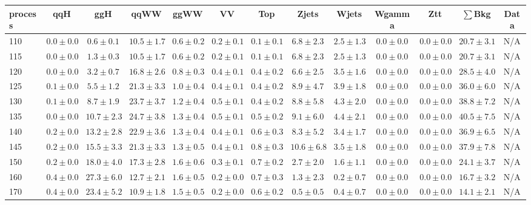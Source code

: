 \begin{table}
{%
 \tiny
 \begin{center}
 \begin{tabular}{l | c c | c c c c c c c c  | c c}
 \hline
 process & qqH & ggH & qqWW & ggWW & VV & Top & Zjets & Wjets & Wgamma & Ztt & $\sum$Bkg & Data \\
 \hline
110 & $0.0\pm0.0$ & $0.6\pm0.1$ & $10.5\pm1.7$ & $0.6\pm0.2$ & $0.2\pm0.1$ & $0.1\pm0.1$ & $6.8\pm2.3$ & $2.5\pm1.3$ & $0.0\pm0.0$ & $0.0\pm0.0$ & $20.7\pm3.1$ & N/A \\
115 & $0.0\pm0.0$ & $1.3\pm0.3$ & $10.5\pm1.7$ & $0.6\pm0.2$ & $0.2\pm0.1$ & $0.1\pm0.1$ & $6.8\pm2.3$ & $2.5\pm1.3$ & $0.0\pm0.0$ & $0.0\pm0.0$ & $20.7\pm3.1$ & N/A \\
120 & $0.0\pm0.0$ & $3.2\pm0.7$ & $16.8\pm2.6$ & $0.8\pm0.3$ & $0.4\pm0.1$ & $0.4\pm0.2$ & $6.6\pm2.5$ & $3.5\pm1.6$ & $0.0\pm0.0$ & $0.0\pm0.0$ & $28.5\pm4.0$ & N/A \\
125 & $0.1\pm0.0$ & $5.5\pm1.2$ & $21.3\pm3.3$ & $1.0\pm0.4$ & $0.4\pm0.1$ & $0.4\pm0.2$ & $8.9\pm4.7$ & $3.9\pm1.8$ & $0.0\pm0.0$ & $0.0\pm0.0$ & $36.0\pm6.0$ & N/A \\
130 & $0.1\pm0.0$ & $8.7\pm1.9$ & $23.7\pm3.7$ & $1.2\pm0.4$ & $0.5\pm0.1$ & $0.4\pm0.2$ & $8.8\pm5.8$ & $4.3\pm2.0$ & $0.0\pm0.0$ & $0.0\pm0.0$ & $38.8\pm7.2$ & N/A \\
135 & $0.0\pm0.0$ & $10.7\pm2.3$ & $24.7\pm3.8$ & $1.3\pm0.4$ & $0.5\pm0.1$ & $0.5\pm0.2$ & $9.1\pm6.0$ & $4.4\pm2.1$ & $0.0\pm0.0$ & $0.0\pm0.0$ & $40.5\pm7.5$ & N/A \\
140 & $0.2\pm0.0$ & $13.2\pm2.8$ & $22.9\pm3.6$ & $1.3\pm0.4$ & $0.4\pm0.1$ & $0.6\pm0.3$ & $8.3\pm5.2$ & $3.4\pm1.7$ & $0.0\pm0.0$ & $0.0\pm0.0$ & $36.9\pm6.5$ & N/A \\
145 & $0.2\pm0.0$ & $15.5\pm3.3$ & $21.3\pm3.3$ & $1.3\pm0.5$ & $0.4\pm0.1$ & $0.8\pm0.3$ & $10.6\pm6.8$ & $3.5\pm1.8$ & $0.0\pm0.0$ & $0.0\pm0.0$ & $37.9\pm7.8$ & N/A \\
150 & $0.2\pm0.0$ & $18.0\pm4.0$ & $17.3\pm2.8$ & $1.6\pm0.6$ & $0.3\pm0.1$ & $0.7\pm0.2$ & $2.7\pm2.0$ & $1.6\pm1.1$ & $0.0\pm0.0$ & $0.0\pm0.0$ & $24.1\pm3.7$ & N/A \\
160 & $0.4\pm0.0$ & $27.3\pm6.0$ & $12.7\pm2.1$ & $1.6\pm0.5$ & $0.2\pm0.0$ & $0.7\pm0.3$ & $1.3\pm2.3$ & $0.2\pm0.7$ & $0.0\pm0.0$ & $0.0\pm0.0$ & $16.7\pm3.2$ & N/A \\
170 & $0.4\pm0.0$ & $23.4\pm5.2$ & $10.9\pm1.8$ & $1.5\pm0.5$ & $0.2\pm0.0$ & $0.6\pm0.2$ & $0.5\pm0.5$ & $0.4\pm0.7$ & $0.0\pm0.0$ & $0.0\pm0.0$ & $14.1\pm2.1$ & N/A \\

\end{tabular}
\end{center}}
\end{table}
